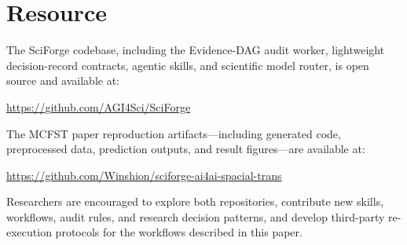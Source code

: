 \documentclass[sn-basic,Numbered,pdflatex]{sn-jnl}
\begin{document}
\begin{appendices}
\end{appendices}

\section*{Resource}

The SciForge codebase, including the Evidence-DAG audit worker, lightweight decision-record contracts, agentic skills, and scientific model router, is open source and available at:

\vspace{4pt}
\centering
\url{https://github.com/AGI4Sci/SciForge}
\vspace{8pt}

\noindent The MCFST paper reproduction artifacts---including generated code, preprocessed data, prediction outputs, and result figures---are available at:

\vspace{4pt}
\centering
\url{https://github.com/Winshion/sciforge-ai4ai-spacial-trans}
\vspace{8pt}

\noindent Researchers are encouraged to explore both repositories, contribute new skills, workflows, audit rules, and research decision patterns, and develop third-party re-execution protocols for the workflows described in this paper.


\end{document}
